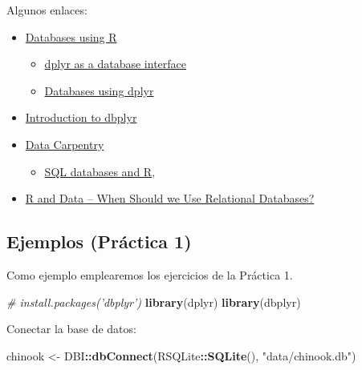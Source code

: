 \documentclass[]{book}
\newenvironment{Shaded}{\begin{snugshade}}{\end{snugshade}}
\newcommand{\KeywordTok}[1]{\textcolor[rgb]{0.13,0.29,0.53}{\textbf{#1}}}
\newcommand{\StringTok}[1]{\textcolor[rgb]{0.31,0.60,0.02}{#1}}
\newcommand{\CommentTok}[1]{\textcolor[rgb]{0.56,0.35,0.01}{\textit{#1}}}
\newcommand{\OperatorTok}[1]{\textcolor[rgb]{0.81,0.36,0.00}{\textbf{#1}}}
\newcommand{\NormalTok}[1]{#1}
\providecommand{\tightlist}{%
  \setlength{\itemsep}{0pt}\setlength{\parskip}{0pt}}
\begin{document}
Algunos enlaces:

\begin{itemize}
\item
  \href{https://db.rstudio.com}{Databases using R}

  \begin{itemize}
  \item
    \href{https://db.rstudio.com/overview}{dplyr as a database
    interface}
  \item
    \href{https://db.rstudio.com/dplyr}{Databases using dplyr}
  \end{itemize}
\item
  \href{https://dbplyr.tidyverse.org/articles/dbplyr.html}{Introduction
  to dbplyr}
\item
  \href{https://datacarpentry.org/R-ecology-lesson/index.html}{Data
  Carpentry}

  \begin{itemize}
  \tightlist
  \item
    \href{https://datacarpentry.org/R-ecology-lesson/05-r-and-databases.html}{SQL
    databases and R},
  \end{itemize}
\item
  \href{https://intellixus.com/2018/06/29/r-and-data-when-should-we-use-relational-databases}{R
  and Data -- When Should we Use Relational Databases?}
\end{itemize}

\subsection{Ejemplos (Práctica 1)}\label{ejemplos-pruxe1ctica-1}

Como ejemplo emplearemos los ejercicios de la Práctica 1.

\begin{Shaded}
\begin{Highlighting}[]
\CommentTok{# install.packages('dbplyr')}
\KeywordTok{library}\NormalTok{(dplyr)}
\KeywordTok{library}\NormalTok{(dbplyr)}
\end{Highlighting}
\end{Shaded}

Conectar la base de datos:

\begin{Shaded}
\begin{Highlighting}[]
\NormalTok{chinook <-}\StringTok{ }\NormalTok{DBI}\OperatorTok{::}\KeywordTok{dbConnect}\NormalTok{(RSQLite}\OperatorTok{::}\KeywordTok{SQLite}\NormalTok{(), }\StringTok{"data/chinook.db"}\NormalTok{)}
\end{Highlighting}
\end{Shaded}
\end{document}
